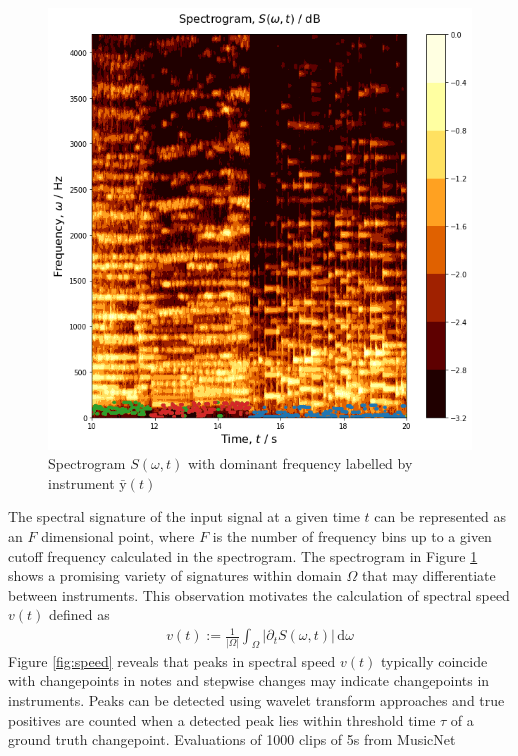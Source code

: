 \documentclass{article}[12pt]
\numberwithin{equation}{section}
\begin{document}
\begin{figure}[H]
\centering{}
\captionsetup{justification=centering}
\includegraphics[scale=0.5]{spectrogram}
\caption{
Spectrogram $S(\omega,t)$ with dominant frequency labelled by instrument $\bar{\mathrm{y}}(t)$
}
\label{fig:spectrogram}
\end{figure}\noindent
The spectral signature of the input signal at a given time $t$ can be
represented as an $F$ dimensional point, where $F$ is the number
of frequency bins up to a given cutoff frequency calculated in the
spectrogram. The spectrogram in Figure \ref{fig:spectrogram} shows a
promising variety of signatures within domain $\Omega$ that may differentiate between instruments.
This observation motivates the calculation of spectral speed $v(t)$ defined as
\begin{align}
	v(t):= \frac{1}{|\Omega|}\int_{\Omega}\!\big|\partial_tS(\omega,t)\big|\,\mathrm{d}\omega
\end{align}
Figure \ref{fig:speed} reveals that peaks in spectral speed $v(t)$ typically
coincide with changepoints in notes and stepwise changes may indicate changepoints
in instruments. Peaks can be detected using wavelet transform approaches \cite{Du2006}
and true positives are counted when a detected peak lies within threshold time $\tau$
of a ground truth changepoint. Evaluations of 1000 clips of 5s from MusicNet
\end{document}

